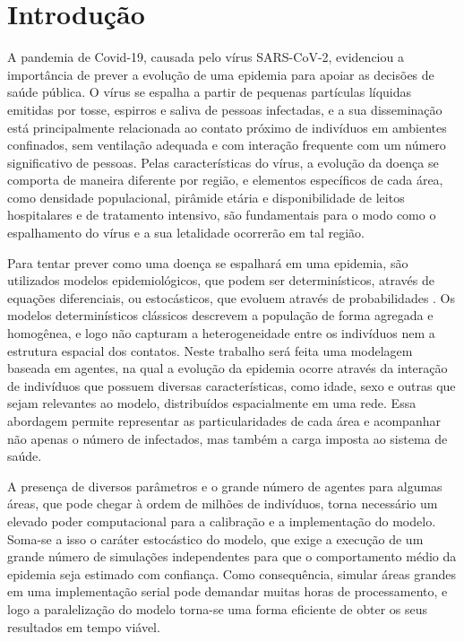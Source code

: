 \chapter{Introdução}
\label{Intro}

A pandemia de Covid-19, causada pelo vírus SARS-CoV-2, evidenciou a importância de prever a evolução de uma epidemia para apoiar as decisões de saúde pública. O vírus se espalha a partir de pequenas partículas líquidas emitidas por tosse, espirros e saliva de pessoas infectadas, e a sua disseminação está principalmente relacionada ao contato próximo de indivíduos em ambientes confinados, sem ventilação adequada e com interação frequente com um número significativo de pessoas. Pelas características do vírus, a evolução da doença se comporta de maneira diferente por região, e elementos específicos de cada área, como densidade populacional, pirâmide etária e disponibilidade de leitos hospitalares e de tratamento intensivo, são fundamentais para o modo como o espalhamento do vírus e a sua letalidade ocorrerão em tal região.

Para tentar prever como uma doença se espalhará em uma epidemia, são utilizados modelos epidemiológicos, que podem ser determinísticos, através de equações diferenciais, ou estocásticos, que evoluem através de probabilidades . Os modelos determinísticos clássicos descrevem a população de forma agregada e homogênea, e logo não capturam a heterogeneidade entre os indivíduos nem a estrutura espacial dos contatos. Neste trabalho será feita uma modelagem baseada em agentes, na qual a evolução da epidemia ocorre através da interação de indivíduos que possuem diversas características, como idade, sexo e outras que sejam relevantes ao modelo, distribuídos espacialmente em uma rede. Essa abordagem permite representar as particularidades de cada área e acompanhar não apenas o número de infectados, mas também a carga imposta ao sistema de saúde.

A presença de diversos parâmetros e o grande número de agentes para algumas áreas, que pode chegar à ordem de milhões de indivíduos, torna necessário um elevado poder computacional para a calibração e a implementação do modelo. Soma-se a isso o caráter estocástico do modelo, que exige a execução de um grande número de simulações independentes para que o comportamento médio da epidemia seja estimado com confiança. Como consequência, simular áreas grandes em uma implementação serial pode demandar muitas horas de processamento, e logo a paralelização do modelo torna-se uma forma eficiente de obter os seus resultados em tempo viável.

